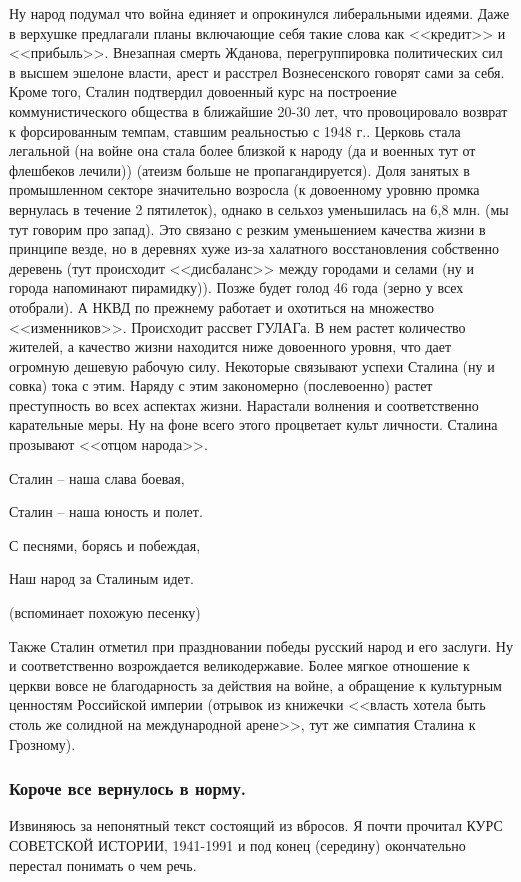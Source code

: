 \documentclass[12pt]{article}
\begin{document}
{    Ну народ подумал что война единяет и опрокинулся либеральными идеями. Даже в верхушке предлагали планы включающие себя такие слова как <<кредит>> и <<прибыль>>. Внезапная смерть Жданова, перегруппировка политических сил в высшем эшелоне власти, арест и расстрел Вознесенского говорят сами за себя. Кроме того, Сталин подтвердил довоенный курс на построение коммунистического общества в ближайшие 20-30 лет, что провоцировало возврат к форсированным темпам, ставшим реальностью с 1948 г.. Церковь стала легальной (на войне она стала более близкой к народу (да и военных тут от флешбеков лечили)) (атеизм больше не пропагандируется). Доля занятых в промышленном секторе значительно возросла (к довоенному уровню промка вернулась в течение 2 пятилеток), однако в сельхоз уменьшилась на 6,8 млн. (мы тут говорим про запад). Это связано с резким уменьшением качества жизни в принципе везде, но в деревнях хуже из-за халатного восстановления собственно деревень (тут происходит <<дисбаланс>> между городами и селами (ну и города напоминают пирамидку)). Позже будет голод 46 года (зерно у всех отобрали). А НКВД по прежнему работает и охотиться на множество <<изменников>>. Происходит рассвет ГУЛАГа. В нем растет количество жителей, а качество жизни находится ниже довоенного уровня, что дает огромную дешевую рабочую силу. Некоторые связывают успехи Сталина (ну и совка) тока с этим. Наряду с этим закономерно (послевоенно) растет преступность во всех аспектах жизни. Нарастали волнения и соответственно карательные меры. Ну на фоне всего этого процветает культ личности. Сталина прозывают <<отцом народа>>.

    Сталин -- наша слава боевая,

    Сталин -- наша юность и полет.

    С песнями, борясь и побеждая,

    Наш народ за Сталиным идет.

    (вспоминает похожую песенку)

    Также Сталин отметил при праздновании победы русский народ и его заслуги. Ну и соответственно возрождается великодержавие. Более мягкое отношение к церкви вовсе не благодарность за действия на войне, а обращение к культурным ценностям Российской империи (отрывок из книжечки <<власть хотела быть столь же солидной на международной арене>>, тут же симпатия Сталина к Грозному).

    \subsubsection*{Короче все вернулось в норму.}

    Извиняюсь за непонятный текст состоящий из вбросов. Я почти прочитал КУРС СОВЕТСКОЙ ИСТОРИИ, 1941-1991 и под конец (середину) окончательно перестал понимать о чем речь.

  }

\end{document}
